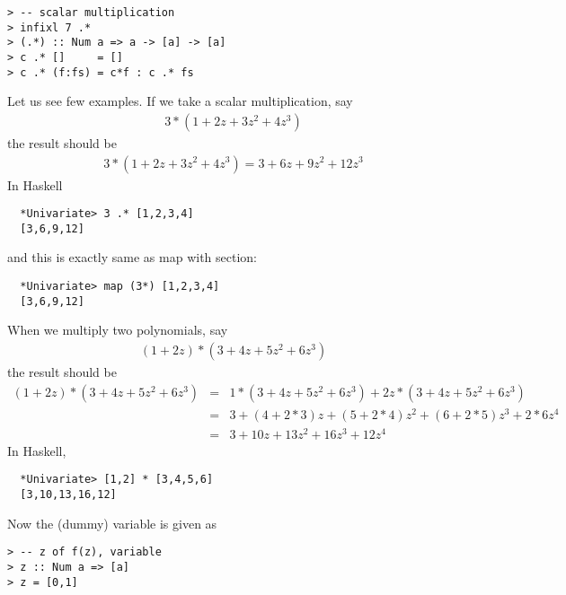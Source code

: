 \documentclass[11pt]{book}
\begin{document}
\begin{verbatim}
> -- scalar multiplication
> infixl 7 .*
> (.*) :: Num a => a -> [a] -> [a]
> c .* []     = []
> c .* (f:fs) = c*f : c .* fs
\end{verbatim}
Let us see few examples.
If we take a scalar multiplication, say
\begin{eqnarray}
3 * \left( 1+2z+3z^2+4z^3\right)
\end{eqnarray}
the result should be
\begin{eqnarray}
3 * \left( 1+2z+3z^2+4z^3\right)
=
3+6z+9z^2+12z^3
\end{eqnarray}
In Haskell 
\begin{verbatim}
  *Univariate> 3 .* [1,2,3,4]
  [3,6,9,12]
\end{verbatim}
and this is exactly same as map with section:
\begin{verbatim}
  *Univariate> map (3*) [1,2,3,4]
  [3,6,9,12]
\end{verbatim}
When we multiply two polynomials, say
\begin{eqnarray}
(1+2z) * (3+4z+5z^2+6z^3)
\end{eqnarray}
the result should be
\begin{eqnarray}
\nonumber
(1+2z) * (3+4z+5z^2+6z^3)
&=& 1*(3+4z+5z^2+6z^3) + 2z*(3+4z+5z^2+6z^3) \\
\nonumber
&=& 3+(4+2*3)z+(5+2*4)z^2+(6+2*5)z^3 + 2*6 z^4 \\
&=& 3+ 10z + 13z^2 + 16 z^3 + 12 z^4 
\end{eqnarray}
In Haskell,
\begin{verbatim}
  *Univariate> [1,2] * [3,4,5,6]
  [3,10,13,16,12]
\end{verbatim}

Now the (dummy) variable is given as 
\begin{verbatim}
> -- z of f(z), variable
> z :: Num a => [a]
> z = [0,1]
\end{verbatim}
\end{document}
